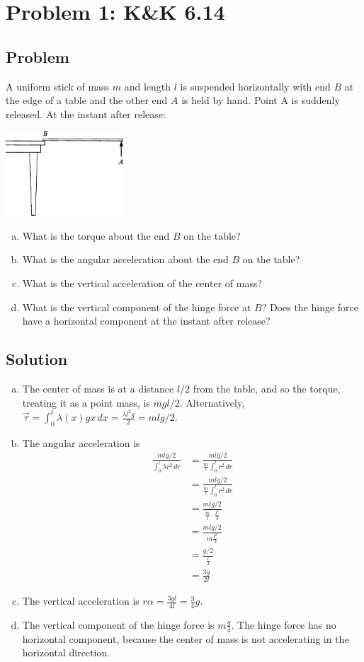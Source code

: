 \documentclass[solutions]{esg8012pset}
\date{Month Day\csname latex@error\endcsname {Date not yet decided}}
\renewcommand{\d}{\,d}
\begin{document}
\section*{Problem 1: K\&K 6.14}
\subsection*{Problem}
  A uniform stick of mass $m$ and length $l$ is suspended horizontally with end $B$ at the edge of a table and the other end $A$ is held by hand. Point A is suddenly released. At the instant after release:
  \begin{center}\includegraphics[width=0.33\textwidth]{ps09_1}\end{center}
  \begin{enumerate}[(a)]
    \item What is the torque about the end $B$ on the table?
    \item What is the angular acceleration about the end $B$ on the table?
    \item What is the vertical acceleration of the center of mass?
    \item What is the vertical component of the hinge force at $B$? Does the hinge force have a horizontal component at the instant after release?
  \end{enumerate}
\subsection*{Solution}
  \begin{enumerate}[(a)]
    \item The center of mass is at a distance $l / 2$ from the table, and so the torque, treating it as a point mass, is $m g l / 2$.  Alternatively, $\vec \tau = \int_0^l \lambda(x) g x \d x = \frac{\lambda l^2 g}{2} = m l g / 2$.
    \item The angular acceleration is \begin{align*}
      \frac{m l g / 2}{\int_0^l \lambda r^2 \d r} & = \frac{m l g / 2}{\frac{m}{l} \int_0^l r^2 \d r } \\
      & = \frac{m l g / 2}{\frac{m}{l} \int_0^l r^2 \d r } \\
      & = \frac{m l g / 2}{\frac{m}{l} \cdot \frac{l^3}{3} } \\
      & = \frac{m l g / 2}{m \frac{l^2}{3} } \\
      & = \frac{g / 2}{\frac{l}{3} } \\
      & = \frac{3 g}{2 l}
      \end{align*}
    \item The vertical acceleration is $r\alpha = \frac{3 g l}{4 l} = \frac{3}{4}g$.
    \item The vertical component of the hinge force is $m\frac{g}{4}$.  The hinge force has no horizontal component, because the center of mass is not accelerating in the horizontal direction.
  \end{enumerate}
\end{document}
